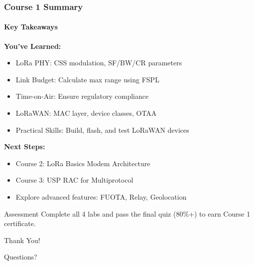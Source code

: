 \documentclass{beamer}
\begin{document}
\begin{frame}
\frametitle{Course 1 Summary}
\framesubtitle{Key Takeaways}

\textbf{You've Learned:}
\begin{itemize}
    \item LoRa PHY: CSS modulation, SF/BW/CR parameters
    \item Link Budget: Calculate max range using FSPL
    \item Time-on-Air: Ensure regulatory compliance
    \item LoRaWAN: MAC layer, device classes, OTAA
    \item Practical Skills: Build, flash, and test LoRaWAN devices
\end{itemize}

\vspace{1em}

\textbf{Next Steps:}
\begin{itemize}
    \item Course 2: LoRa Basics Modem Architecture
    \item Course 3: USP RAC for Multiprotocol
    \item Explore advanced features: FUOTA, Relay, Geolocation
\end{itemize}

\vspace{1em}

\begin{block}{Assessment}
Complete all 4 labs and pass the final quiz (80\%+) to earn Course 1 certificate.
\end{block}
\end{frame}

\begin{frame}[plain]
\centering
\Huge Thank You!

\vspace{2em}

\large Questions?

\vspace{2em}

\normalsize

\end{frame}
\end{document}
